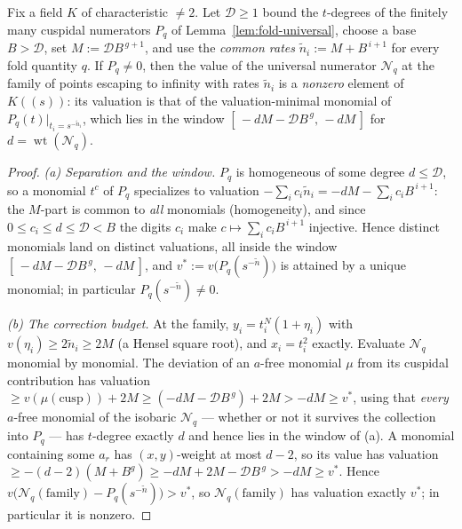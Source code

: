 \begin{lemma}
\label{lem:cusp-descent}
\leanok
Fix a field $K$ of characteristic $\neq 2$. Let $\mathcal{D} \ge 1$ bound the
$t$-degrees of the finitely many cuspidal numerators $P_q$ of
Lemma~\ref{lem:fold-universal}, choose a base $B > \mathcal{D}$, set
$M := \mathcal{D}B^{\,g+1}$, and use the \emph{common rates}
$\tilde n_i := M + B^{\,i+1}$ for every fold quantity $q$. If $P_q \neq 0$, then the
value of the universal numerator $\mathcal{N}_q$ at the family of points escaping to
infinity with rates $\tilde n_i$ is a \emph{nonzero} element of $K(\!(s)\!)$: its
valuation is that of the valuation-minimal monomial of
$P_q(t)\rvert_{t_i = s^{-\tilde n_i}}$, which lies in the window
$[\,-dM - \mathcal{D}B^{\,g},\, -dM\,]$ for $d = \operatorname{wt}(\mathcal{N}_q)$.
\end{lemma}
\begin{proof}
\leanok
\emph{(a) Separation and the window.} $P_q$ is homogeneous of some degree
$d \le \mathcal{D}$, so a monomial $t^c$ of $P_q$ specializes to valuation
$-\sum_i c_i \tilde n_i = -dM - \sum_i c_i B^{\,i+1}$: the $M$-part is common to
\emph{all} monomials (homogeneity), and since $0 \le c_i \le d \le \mathcal{D} < B$ the
digits $c_i$ make $c \mapsto \sum_i c_i B^{\,i+1}$ injective. Hence distinct monomials
land on distinct valuations, all inside the window
$[\,-dM - \mathcal{D}B^{\,g},\, -dM\,]$, and
$v^\ast := v\bigl(P_q(s^{-\tilde n})\bigr)$ is attained by a unique monomial; in
particular $P_q(s^{-\tilde n}) \neq 0$.

\emph{(b) The correction budget.} At the family, $y_i = t_i^N (1 + \eta_i)$ with
$v(\eta_i) \ge 2\tilde n_i \ge 2M$ (a Hensel square root), and $x_i = t_i^2$ exactly.
Evaluate $\mathcal{N}_q$ monomial by monomial. The deviation of an $a$-free monomial
$\mu$ from its cuspidal contribution has valuation
$\ge v(\mu(\text{cusp})) + 2M \ge (-dM - \mathcal{D}B^{\,g}) + 2M > -dM \ge v^\ast$,
using that \emph{every} $a$-free monomial of the isobaric $\mathcal{N}_q$ --- whether
or not it survives the collection into $P_q$ --- has $t$-degree exactly $d$ and hence
lies in the window of (a). A monomial containing some $a_r$ has $(x,y)$-weight at most
$d - 2$, so its value has valuation
$\ge -(d-2)(M + B^g) \ge -dM + 2M - \mathcal{D}B^{\,g} > -dM \ge v^\ast$. Hence
$v\bigl(\mathcal{N}_q(\text{family}) - P_q(s^{-\tilde n})\bigr) > v^\ast$, so
$\mathcal{N}_q(\text{family})$ has valuation exactly $v^\ast$; in particular it is
nonzero.
\end{proof}

